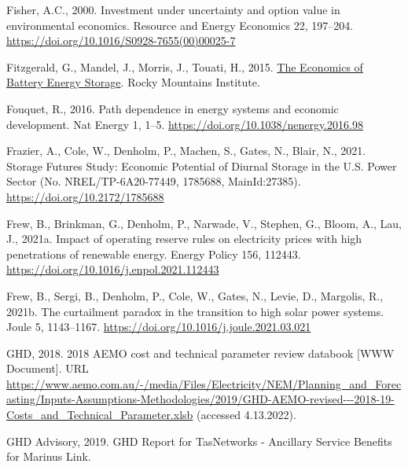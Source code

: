 \documentclass[12pt,a4paper,]{report}
\newlength{\cslhangindent}
\newenvironment{CSLReferences}[2] %
 {%
  \setlength{\parindent}{0pt}
  \ifodd #1 \everypar{\setlength{\hangindent}{\cslhangindent}}\ignorespaces\fi
  \ifnum #2 > 0
  \setlength{\parskip}{#2\baselineskip}
  \fi
 }%
 {}
\begin{document}
\begin{CSLReferences}{1}{0}
\leavevmode{}%
Fisher, A.C., 2000. Investment under uncertainty and option value in
environmental economics. Resource and Energy Economics 22, 197--204.
\url{https://doi.org/10.1016/S0928-7655(00)00025-7}

\leavevmode{}%
Fitzgerald, G., Mandel, J., Morris, J., Touati, H., 2015.
\href{https://rmi.org/insight/economics-battery-energy-storage/}{The
{Economics} of {Battery Energy Storage}}. Rocky Mountains Institute.

\leavevmode{}%
Fouquet, R., 2016. Path dependence in energy systems and economic
development. Nat Energy 1, 1--5.
\url{https://doi.org/10.1038/nenergy.2016.98}

\leavevmode{}%
Frazier, A., Cole, W., Denholm, P., Machen, S., Gates, N., Blair, N.,
2021. Storage {Futures Study}: {Economic Potential} of {Diurnal Storage}
in the {U}.{S}. {Power Sector} (No. NREL/TP-6A20-77449, 1785688,
MainId:27385). \url{https://doi.org/10.2172/1785688}

\leavevmode{}%
Frew, B., Brinkman, G., Denholm, P., Narwade, V., Stephen, G., Bloom,
A., Lau, J., 2021a. Impact of operating reserve rules on electricity
prices with high penetrations of renewable energy. Energy Policy 156,
112443. \url{https://doi.org/10.1016/j.enpol.2021.112443}

\leavevmode{}%
Frew, B., Sergi, B., Denholm, P., Cole, W., Gates, N., Levie, D.,
Margolis, R., 2021b. The curtailment paradox in the transition to high
solar power systems. Joule 5, 1143--1167.
\url{https://doi.org/10.1016/j.joule.2021.03.021}

\leavevmode{}%
GHD, 2018. 2018 {AEMO} cost and technical parameter review databook
{[}WWW Document{]}. URL
\url{https://www.aemo.com.au/-/media/Files/Electricity/NEM/Planning_and_Forecasting/Inputs-Assumptions-Methodologies/2019/GHD-AEMO-revised---2018-19-Costs_and_Technical_Parameter.xlsb}
(accessed 4.13.2022).

\leavevmode{}%
GHD Advisory, 2019. {GHD Report} for {TasNetworks} - {Ancillary Service
Benefits} for {Marinus Link}.


\end{CSLReferences}
\end{document}
